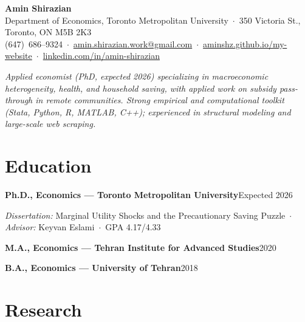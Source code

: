\documentclass[10pt]{article}
\newcommand{\entry}[2]{%
  \textbf{#1}\hfill{#2}\par\vspace{2pt}%
}
\begin{document}
\begin{center}
  {\Huge\bfseries\color{accent} Amin Shirazian}\\[5pt]
  \small
  Department of Economics, Toronto Metropolitan University \,$\cdot$\, 350 Victoria St., Toronto, ON M5B 2K3\\[2pt]
  (647)~686--9324 \,$\cdot$\,
  \href{mailto:amin.shirazian.work@gmail.com}{amin.shirazian.work@gmail.com} \,$\cdot$\,
  \href{https://aminshz.github.io/my-website}{aminshz.github.io/my-website} \,$\cdot$\,
  \href{https://linkedin.com/in/amin-shirazian}{linkedin.com/in/amin-shirazian}
\end{center}

\vspace{6pt}
\noindent\RaggedRight\textit{Applied economist (PhD, expected 2026) specializing in macroeconomic heterogeneity, health, and household saving, with applied work on subsidy pass-through in remote communities. Strong empirical and computational toolkit (Stata, Python, R, MATLAB, C++); experienced in structural modeling and large-scale web scraping.}

\section{Education}

\entry{Ph.D., Economics --- Toronto Metropolitan University}{Expected 2026}
\textit{Dissertation:} Marginal Utility Shocks and the Precautionary Saving Puzzle \,$\cdot$\,
\textit{Advisor:} Keyvan Eslami \,$\cdot$\, GPA 4.17/4.33

\vspace{4pt}
\entry{M.A., Economics --- Tehran Institute for Advanced Studies}{2020}
\entry{B.A., Economics --- University of Tehran}{2018}

\section{Research}
\end{document}
